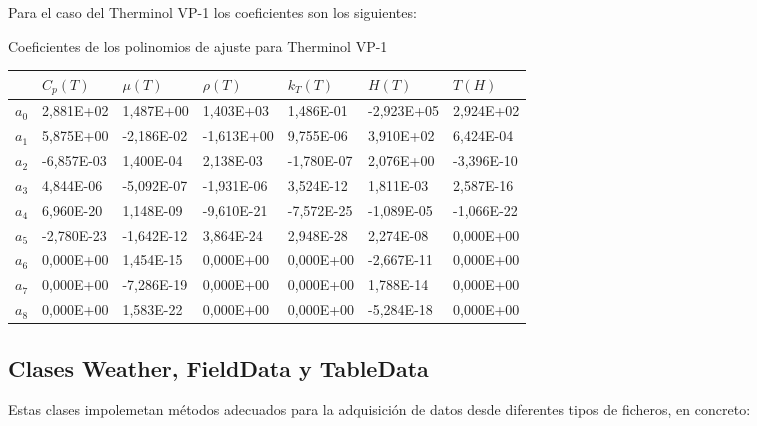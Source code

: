 Para el caso del Therminol VP-1 los coeficientes son los siguientes:

Coeficientes de los polinomios de ajuste para Therminol VP-1

\begin{longtable}[]{@{}lllllll@{}}

& \(C_p(T)\) & \(\mu(T)\) & \(\rho(T)\) & \(k_T(T)\) & \(H(T)\) &
\(T(H)\)\tabularnewline

\endhead
\(a_0\) & 2,881E+02 & 1,487E+00 & 1,403E+03 & 1,486E-01 & -2,923E+05 &
2,924E+02\tabularnewline
\(a_1\) & 5,875E+00 & -2,186E-02 & -1,613E+00 & 9,755E-06 & 3,910E+02 &
6,424E-04\tabularnewline
\(a_2\) & -6,857E-03 & 1,400E-04 & 2,138E-03 & -1,780E-07 & 2,076E+00 &
-3,396E-10\tabularnewline
\(a_3\) & 4,844E-06 & -5,092E-07 & -1,931E-06 & 3,524E-12 & 1,811E-03 &
2,587E-16\tabularnewline
\(a_4\) & 6,960E-20 & 1,148E-09 & -9,610E-21 & -7,572E-25 & -1,089E-05 &
-1,066E-22\tabularnewline
\(a_5\) & -2,780E-23 & -1,642E-12 & 3,864E-24 & 2,948E-28 & 2,274E-08 &
0,000E+00\tabularnewline
\(a_6\) & 0,000E+00 & 1,454E-15 & 0,000E+00 & 0,000E+00 & -2,667E-11 &
0,000E+00\tabularnewline
\(a_7\) & 0,000E+00 & -7,286E-19 & 0,000E+00 & 0,000E+00 & 1,788E-14 &
0,000E+00\tabularnewline
\(a_8\) & 0,000E+00 & 1,583E-22 & 0,000E+00 & 0,000E+00 & -5,284E-18 &
0,000E+00\tabularnewline

\end{longtable}


\subsection{Clases Weather, FieldData y TableData}
\label{clases-weather}
Estas clases impolemetan métodos adecuados para la adquisición de datos desde diferentes tipos de ficheros, en concreto:

